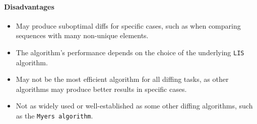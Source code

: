 \paragraph{Disadvantages}
\begin{itemize}
    \item May produce suboptimal diffs for specific cases, such as when comparing sequences with many non-unique elements.
    \item The algorithm's performance depends on the choice of the underlying \lstinline{LIS} algorithm.
    \item May not be the most efficient algorithm for all diffing tasks, as other algorithms may produce better results in specific cases.
    \item Not as widely used or well-established as some other diffing algorithms, such as the \lstinline{Myers algorithm}.
\end{itemize}


